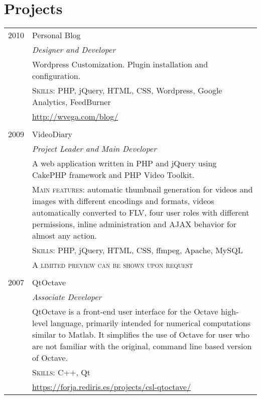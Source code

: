 \documentclass[letter,10pt]{article}
\begin{document}
\section{Projects}
\begin{tabular}{r|p{13cm}}
 \textsc{2010} & Personal Blog\\
 & \emph{Designer and Developer}\\
 & \footnotesize{Wordpress Customization. Plugin installation and configuration.}\\
 & \textsc{Skills:} PHP, jQuery, HTML, CSS, Wordpress, Google Analytics, FeedBurner\\
 & \href{http://wvega.com/blog/}{http://wvega.com/blog/}\\\multicolumn{2}{c}{} \\

 \textsc{2009} & VideoDiary\\
 & \emph{Project Leader and Main Developer}\\
 & \footnotesize{A web application written in PHP and jQuery using CakePHP framework and PHP Video Toolkit.}\\
 & \textsc{Main features:} \footnotesize{automatic thumbnail generation for videos and images with different encodings and formats, videos automatically converted to FLV, four user roles with different permissions, inline administration and AJAX behavior for almost any action.}\\
 & \textsc{Skills:} PHP, jQuery, HTML, CSS, ffmpeg, Apache, MySQL\\
 & \textsc{A limited preview can be shown upon request}\\\multicolumn{2}{c}{} \\

 \textsc{2007} & QtOctave\\
 & \emph{Associate Developer}\\
 & \footnotesize{QtOctave is a front-end user interface for the Octave high-level language, primarily intended for numerical computations similar to Matlab. It simplifies the use of Octave for user who are not familiar with the original, command line based version of Octave.}\\
 & \textsc{Skills:} C++, Qt\\
 & \href{https://forja.rediris.es/projects/csl-qtoctave/}{https://forja.rediris.es/projects/csl-qtoctave/}%
\end{tabular}
\end{document}
